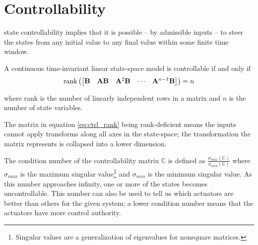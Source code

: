 \section{Controllability}

\Gls{state} controllability implies that it is possible -- by admissible inputs
-- to steer the \glspl{state} from any initial value to any final value within
some finite time window.
\begin{theorem}[Controllability]
  A continuous \gls{time-invariant} linear state-space \gls{model} is
  controllable if and only if
  \begin{equation}
    \operatorname{rank}\left(
    \begin{bmatrix}
      \mathbf{B} & \mathbf{A}\mathbf{B} & \mathbf{A}^2\mathbf{B} & \cdots &
      \mathbf{A}^{n-1}\mathbf{B}
    \end{bmatrix}
    \right) = n
    \label{eq:ctrl_rank}
  \end{equation}

  where rank is the number of linearly independent rows in a matrix and $n$ is
  the number of \gls{state} variables.
\end{theorem}

The matrix in equation \eqref{eq:ctrl_rank} being rank-deficient means the
\glspl{input} cannot apply transforms along all axes in the state-space; the
transformation the matrix represents is collapsed into a lower dimension.

The condition number of the controllability matrix $\mathbb{C}$ is defined as
$\frac{\sigma_{max}(\mathbb{C})}{\sigma_{min}(\mathbb{C})}$ where $\sigma_{max}$
is the maximum singular value\footnote{\label{footn:singular_val}Singular values
are a generalization of eigenvalues for nonsquare matrices.} and $\sigma_{min}$
is the minimum singular value. As this number approaches infinity, one or more
of the \glspl{state} becomes uncontrollable. This number can also be used to
tell us which actuators are better than others for the given \gls{system}; a
lower condition number means that the actuators have more control authority.
